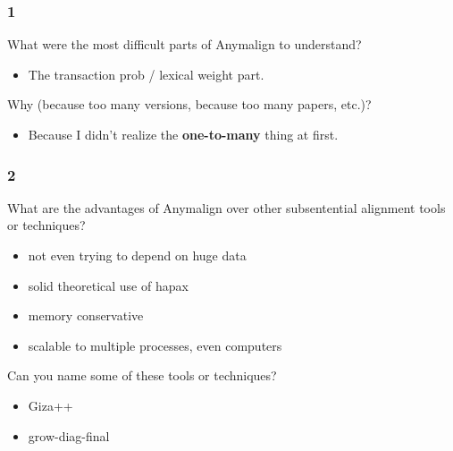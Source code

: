 \begin{frame}\frametitle{1}

\begin{block}{What were the most difficult parts of Anymalign to
understand?}

\begin{itemize}
\itemsep1pt\parskip0pt
\item
  The transaction prob / lexical weight part.
\end{itemize}

\end{block}

\begin{block}{Why (because too many versions, because too many papers,
etc.)?}

\begin{itemize}
\itemsep1pt\parskip0pt
\item
  Because I didn't realize the \textbf{one-to-many} thing at first.
\end{itemize}

\end{block}

\end{frame}

\begin{frame}\frametitle{2}

\begin{block}{What are the advantages of Anymalign over other
subsentential alignment tools or techniques?}

\begin{itemize}
\item
  not even trying to depend on huge data
\item
  solid theoretical use of hapax
\item
  memory conservative
\item
  scalable to multiple processes, even computers
\end{itemize}

\end{block}

\begin{block}{Can you name some of these tools or techniques?}

\begin{itemize}
\itemsep1pt\parskip0pt
\item
  Giza++
\item
  grow-diag-final
\end{itemize}

\end{block}

\end{frame}

